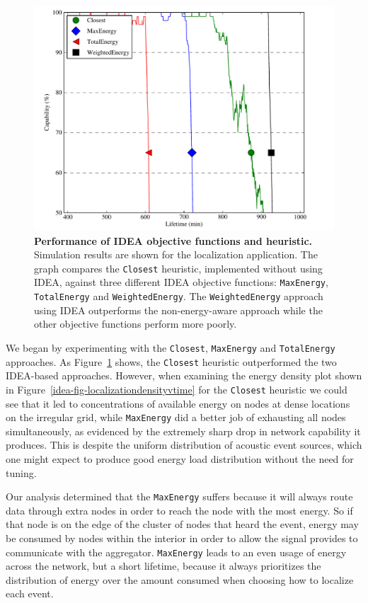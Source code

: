 \begin{figure}[t]
\begin{center}
\includegraphics[width=0.7\hsize]{./5-idea/figs/ideavheuristics.pdf}
\end{center}

\caption{\textbf{Performance of IDEA objective functions and heuristic.}
Simulation results are shown for the localization application. The graph
compares the \texttt{Closest} heuristic, implemented without using IDEA,
against three different IDEA objective functions: \texttt{MaxEnergy},
\texttt{TotalEnergy} and \texttt{WeightedEnergy}. The \texttt{WeightedEnergy}
approach using IDEA outperforms the non-energy-aware approach while the other
objective functions perform more poorly.}

\label{idea-fig-ideavheuristics}
\end{figure}

We began by experimenting with the \texttt{Closest}, \texttt{MaxEnergy} and
\texttt{TotalEnergy} approaches. As Figure~\ref{idea-fig-ideavheuristics}
shows, the \texttt{Closest} heuristic outperformed the two IDEA-based
approaches. However, when examining the energy density plot shown in
Figure~\ref{idea-fig-localizationdensityvtime} for the \texttt{Closest}
heuristic we could see that it led to concentrations of available energy on
nodes at dense locations on the irregular grid, while \texttt{MaxEnergy} did
a better job of exhausting all nodes simultaneously, as evidenced by the
extremely sharp drop in network capability it produces. This is despite the
uniform distribution of acoustic event sources, which one might expect to
produce good energy load distribution without the need for tuning.

Our analysis determined that the \texttt{MaxEnergy} suffers because it will
always route data through extra nodes in order to reach the node with the
most energy. So if that node is on the edge of the cluster of nodes that
heard the event, energy may be consumed by nodes within the interior in order
to allow the signal provides to communicate with the aggregator.
\texttt{MaxEnergy} leads to an even usage of energy across the network, but a
short lifetime, because it always prioritizes the distribution of energy over
the amount consumed when choosing how to localize each event.

